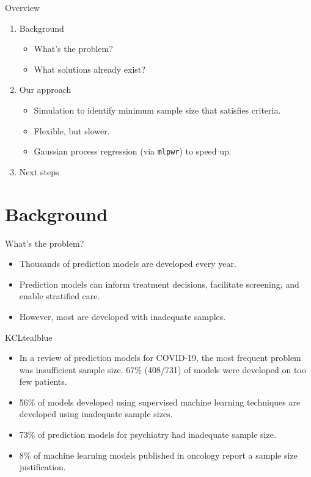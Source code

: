 \documentclass[11pt]{beamer}
\begin{document}
\begin{frame}[t]{Overview}
	\begin{enumerate}
		\item Background
		      \begin{itemize}
			      \item What's the problem?
			      \item What solutions already exist?
		      \end{itemize}
		\item Our approach
		      \begin{itemize}
			      \item Simulation to identify minimum sample size that satisfies criteria.
			      \item Flexible, but slower.
			      \item Gaussian process regression (via \texttt{mlpwr}) to speed up.
		      \end{itemize}
		\item Next steps
	\end{enumerate}
\end{frame}

\section{Background}

\begin{frame}[t]{What's the problem?}

	\begin{itemize}
		\item Thousands of prediction models are developed every year.
		\item Prediction models can inform treatment decisions, facilitate
		      screening, and enable stratified care.
		\item  However, most are developed with inadequate samples.
	\end{itemize}

	\begin{cbox}{KCLtealblue}{}
		\begin{itemize}
			\item In a review of prediction models for COVID-19, the most
			      frequent problem was insufficient sample size. 67\%
			      (408/731) of models were developed on too few
			      patients\autocite{wynants2020}.
			\item 56\% of models developed using supervised machine learning
			      techniques are developed using inadequate sample
			      sizes\autocite{navarro2021}.
			\item 73\% of prediction models for psychiatry had inadequate
			      sample size\autocite{meehan2022}.
			\item 8\% of machine learning models published in oncology report a
			      sample size justification\autocite{dhiman2022}.
		\end{itemize}
	\end{cbox}
\end{frame}
\end{document}
